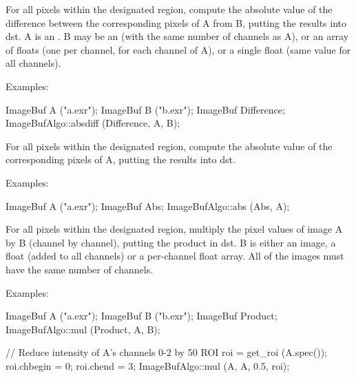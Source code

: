 For all pixels within the designated region, compute the absolute value of
the difference between the corresponding pixels of {\cf A} from {\cf B},
putting the results into {\cf dst}. {\cf A} is an \ImageBuf.  {\cf B} may be
an \ImageBuf (with the same number of channels as {\cf A}), or an array of
floats (one per channel, for each channel of {\cf A}), or a single float
(same value for all channels).

\smallskip
\noindent Examples:
\begin{code}
    ImageBuf A ("a.exr");
    ImageBuf B ("b.exr");
    ImageBuf Difference;
    ImageBufAlgo::absdiff (Difference, A, B);
\end{code}
\apiend


 

For all pixels within the designated region, compute the absolute value of
the corresponding pixels of {\cf A}, putting the results into {\cf dst}.

\smallskip
\noindent Examples:
\begin{code}
    ImageBuf A ("a.exr");
    ImageBuf Abs;
    ImageBufAlgo::abs (Abs, A);
\end{code}
\apiend



 

For all pixels within the designated region, multiply the pixel values
of image {\cf A} by {\cf B} (channel by channel), putting the product in
{\cf dst}.  {\cf B} is either an image,
a float (added to all channels) or a per-channel float array.
All of the images must have the same number of channels.

\smallskip
\noindent Examples:
\begin{code}
    ImageBuf A ("a.exr");
    ImageBuf B ("b.exr");
    ImageBuf Product;
    ImageBufAlgo::mul (Product, A, B);

    // Reduce intensity of A's channels 0-2 by 50%
    ROI roi = get_roi (A.spec());
    roi.chbegin = 0;  roi.chend = 3;
    ImageBufAlgo::mul (A, A, 0.5, roi);
\end{code}
\apiend


